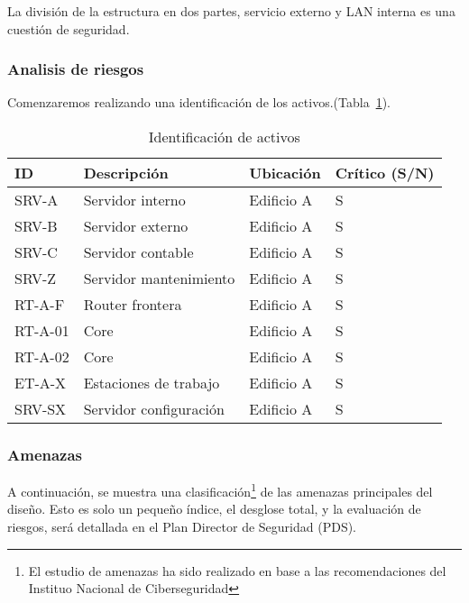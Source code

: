 \documentclass[a4paper,onecolumn,11pt]{article}
\begin{document}
La división de la estructura en dos partes, servicio externo y LAN interna es una cuestión de seguridad.
\subsubsection{Analisis de riesgos}
Comenzaremos realizando una identificación de los activos.(Tabla~\ref{tab:activos}).

\begin{table}[htbp]
\small \sffamily
\caption{Identificación de activos}
\begin{center}
\begin{tabular}{p{}p{}p{}p{}}
\toprule
\textbf{ID} &  \textbf{Descripción} & \textbf{Ubicación} & \textbf{Crítico (S/N)}\\
\toprule
SRV-A & Servidor interno & Edificio A &  S\\ \midrule
SRV-B & Servidor externo & Edificio A &  S\\ \midrule
SRV-C & Servidor contable & Edificio A &  S\\ \midrule
SRV-Z & Servidor mantenimiento & Edificio A &  S\\ \midrule
RT-A-F & Router frontera & Edificio A &  S\\ \midrule
RT-A-01 & Core & Edificio A &  S\\ \midrule
RT-A-02 & Core & Edificio A &  S\\ \midrule
ET-A-X & Estaciones de trabajo & Edificio A &  S\\ \midrule
SRV-SX & Servidor configuración & Edificio A &  S\\
\bottomrule
\end{tabular}
\end{center}
\label{tab:activos}
\end{table}

\subsubsection{Amenazas}
A continuación, se muestra una clasificación\footnote{El estudio de amenazas ha sido realizado en base a las recomendaciones del Instituo Nacional de Ciberseguridad\cite{Incibe}} de las amenazas principales del diseño.
Esto es solo un pequeño índice, el desglose total, y la evaluación de riesgos, será detallada en el Plan Director de Seguridad (PDS).
\end{document}
